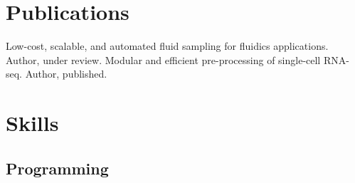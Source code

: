 \documentclass[]{resume}
\begin{document}
\begin{minipage}[t]{0.28\textwidth}


\section{Publications}
\renewcommand\refname{\vskip -1.5em} %
\begin{thebibliography}{9}
Low-cost, scalable, and automated fluid sampling for fluidics applications. Author, under review.
Modular and efficient pre-processing of single-cell RNA-seq. Author, published.
\end{thebibliography}

\section{Skills}
\subsection{Programming}
\\
\\
\\
\sectionsep


\end{minipage}
\end{document}
